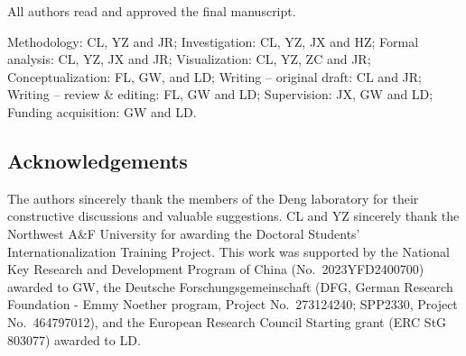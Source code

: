 \documentclass[11pt,a4paper]{article}
\begin{document}
All authors read and approved the final manuscript.

Methodology: CL, YZ and JR; Investigation: CL, YZ, JX and HZ; Formal
analysis: CL, YZ, JX and JR; Visualization: CL, YZ, ZC and JR;
Conceptualization: FL, GW, and LD; Writing -- original draft: CL and JR;
Writing -- review \& editing: FL, GW and LD; Supervision: JX, GW and LD;
Funding acquisition: GW and LD.

\subsection{Acknowledgements}\label{acknowledgements}

The authors sincerely thank the members of the Deng laboratory for their
constructive discussions and valuable suggestions. CL and YZ sincerely
thank the Northwest A\&F University for awarding the Doctoral Students'
Internationalization Training Project. This work was supported by the National Key Research and Development
Program of China (No.~2023YFD2400700) awarded to GW, the Deutsche
Forschungsgemeinschaft (DFG, German Research Foundation - Emmy Noether
program, Project No.~273124240; SPP2330, Project No.~464797012), and the
European Research Council Starting grant (ERC StG 803077) awarded to LD.


\renewcommand\refname{Reference}
 

\end{document}

